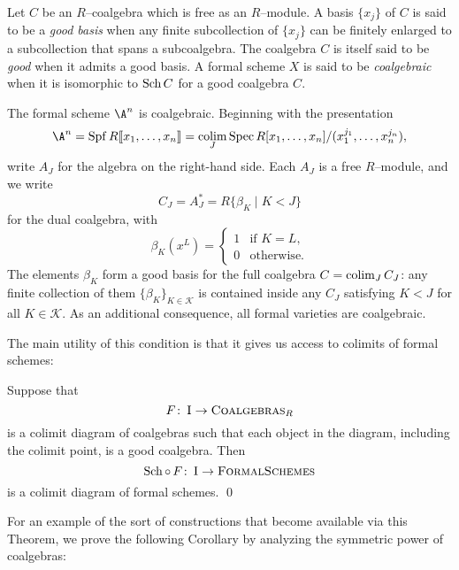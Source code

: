 \begin{definition}\label{DefnCoalgebraicFormalScheme}
Let \(C\) be an \(R\)--coalgebra which is free as an \(R\)--module.  A basis \(\{x_j\}\) of \(C\) is said to be a \textit{good basis} when any finite subcollection of \(\{x_j\}\) can be finitely enlarged to a subcollection that spans a subcoalgebra.  The coalgebra \(C\) is itself said to be \textit{good} when it admits a good basis.  A formal scheme \(X\) is said to be \textit{coalgebraic} when it is isomorphic to \(\operatorname{Sch} C\) for a good coalgebra \(C\).
\end{definition}

\begin{example}\label{FVarsAreCoalgebraic}
The formal scheme \(\A^n\) is coalgebraic.  Beginning with the presentation \[\A^n = \Spf R\ps{x_1, \ldots, x_n} = \colim_J \Spec R[x_1, \ldots, x_n] / (x_1^{j_1}, \ldots, x_n^{j_n}),\] write \(A_J\) for the algebra on the right-hand side.  Each \(A_J\) is a free \(R\)--module, and we write \[C_J = A_J^* = R\{\beta_K \mid K < J\}\] for the dual coalgebra, with \[\beta_K(x^L) = \begin{cases} 1 & \text{if \(K = L\)}, \\ 0 & \text{otherwise}. \end{cases}\]  The elements \(\beta_K\) form a good basis for the full coalgebra \(C = \operatorname*{colim}_J C_J\): any finite collection of them \(\{\beta_K\}_{K \in \mathcal K}\) is contained inside any \(C_J\) satisfying \(K < J\) for all \(K \in \mathcal K\).  As an additional consequence, all formal varieties are coalgebraic.
\end{example}

The main utility of this condition is that it gives us access to colimits of formal schemes:

\begin{theorem}\label{CoalgebraicColimitsExist}
Suppose that \[F\colon\thinspace \normalfont\textsc{I} \to \normalfont\textsc{Coalgebras}_R\] is a colimit diagram of coalgebras such that each object in the diagram, including the colimit point, is a good coalgebra.  Then \[\operatorname{Sch} \circ \, F\colon\thinspace \normalfont\textsc{I} \to \normalfont\textsc{FormalSchemes}\] is a colimit diagram of formal schemes. \qed
\end{theorem}

\noindent For an example of the sort of constructions that become available via this Theorem, we prove the following Corollary by analyzing the symmetric power of coalgebras:


